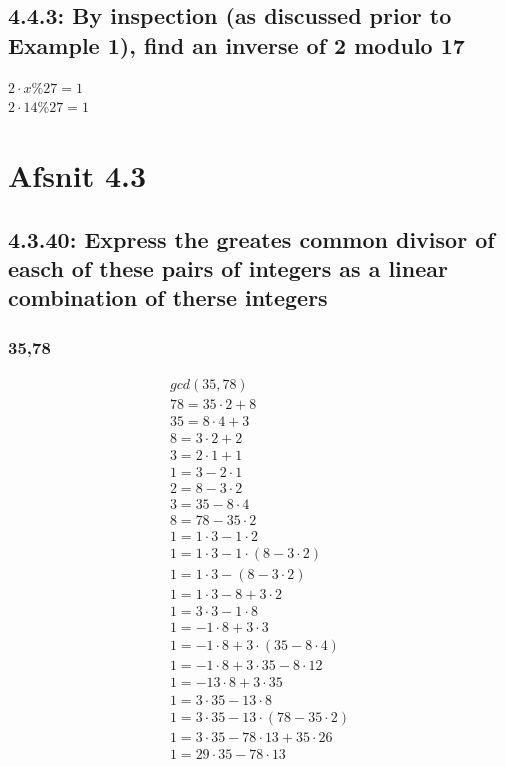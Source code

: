 \documentclass[12pt, a4paper]{report}
\begin{document}
				\subsection{4.4.3: By inspection (as discussed prior to Example 1), find an inverse of 2 modulo 17}
					$2\cdot x \% 27 =1$\\
					$2\cdot 14 \% 27 = 1$
			\setcounter{section}{0}
			\section{Afsnit 4.3}
				\setcounter{subsection}{39}
				\subsection{4.3.40: Express the greates common divisor of easch of these pairs of integers as a linear combination of therse integers}
					\setcounter{subsubsection}{2}
					\subsubsection{35,78}
						\begin{align*}
						gcd(35,78)\\
						78=35\cdot 2 +8\\
						35=8\cdot 4+3\\
						8=3\cdot 2 + 2\\
						3=2\cdot 1 +1\\[4mm]
						1=3-2\cdot 1\\
						2=8-3\cdot 2\\
						3=35-8\cdot 4\\
						8=78-35\cdot 2\\[4mm]
						1=1\cdot 3-1\cdot 2\\
						1=1\cdot 3 - 1\cdot (8-3\cdot 2)\\
						1=1\cdot 3 -(8-3\cdot 2)\\
						1=1\cdot 3 -8+3\cdot 2\\
						1=3\cdot 3 -1\cdot 8\\
						1=-1\cdot 8 + 3\cdot 3\\
						1=-1\cdot 8 + 3\cdot (35-8\cdot 4)\\
						1=-1\cdot 8 + 3\cdot 35 - 8\cdot 12\\
						1=-13\cdot 8 + 3\cdot 35\\
						1=3\cdot 35 - 13\cdot 8\\
						1=3\cdot 35 - 13\cdot (78-35\cdot 2)\\
						1=3\cdot 35 - 78\cdot 13 + 35\cdot 26\\
						1=29\cdot 35 - 78\cdot 13\\
						\end{align*}
\end{document}
